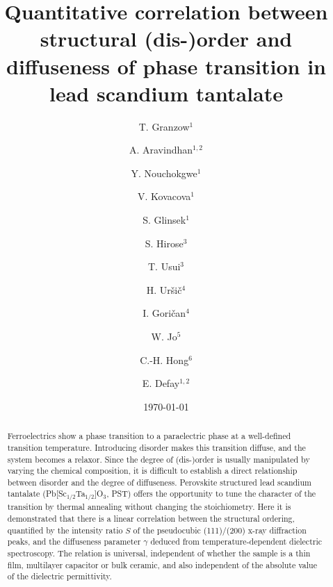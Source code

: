 \documentclass[%
 preprint, %
 amsmath,amssymb,
 aps, physrev,
]{revtex4-2}
\begin{document}

\title{Quantitative correlation between structural (dis-)order and diffuseness of phase transition in lead scandium tantalate}

\author{T. Granzow$^1$}


\author{A. Aravindhan$^{1,2}$}%
\author{Y. Nouchokgwe$^1$}%
\author{V. Kovacova$^1$}%
\author{S. Glinsek$^1$}%

\author{S. Hirose$^3$}
\author{T. Usui$^3$}

\author{H. Ur\v{s}i\v{c}$^4$}
\author{I. Gori\v{c}an$^4$}

\author{W. Jo$^5$}

\author{C.-H. Hong$^6$}

\author{E. Defay$^{1,2}$}%
 
%

%

%

%
%
%
\date{\today}

\begin{abstract}
Ferroelectrics show a phase transition to a paraelectric phase at a well-defined transition temperature. Introducing disorder makes this transition diffuse, and the system becomes a relaxor. Since the degree of (dis-)order is usually manipulated by varying the chemical composition, it is difficult to establish a direct relationship between disorder and the degree of diffuseness. Perovskite structured lead scandium tantalate (Pb[Sc$_{1/2}$Ta$_{1/2}$]O$_3$, PST) offers the opportunity to tune the character of the transition by thermal annealing without changing the stoichiometry. Here it is demonstrated that there is a linear correlation between the structural ordering, quantified by the intensity ratio $S$ of the pseudocubic (111)/(200) x-ray diffraction peaks, and the diffuseness parameter $\gamma$ deduced from temperature-dependent dielectric spectroscopy. The relation is universal, independent of whether the sample is a thin film, multilayer capacitor or bulk ceramic, and also independent of the absolute value of the dielectric permittivity.
%
\end{abstract}
\end{document}
